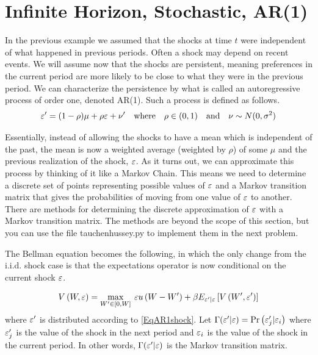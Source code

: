 \section*{Infinite Horizon, Stochastic, AR(1)}\label{SecRecProbInfinHorStochAR1}

In the previous example we assumed that the shocks at time $t$ were independent of what happened in previous periods.  Often a shock may depend on recent events.  We will assume now that the shocks are persistent, meaning preferences in the current period are more likely to be close to what they were in the previous period.  We can characterize the persistence by what is called an autoregressive process of order one, denoted AR(1).  Such a process is defined as follows.
\begin{equation}\label{EqAR1shock}
   \varepsilon' = (1-\rho)\mu + \rho\varepsilon + \nu' \quad\text{where}\quad \rho\in(0,1) \quad\text{and}\quad \nu\sim N(0,\sigma^2)
\end{equation}

Essentially, instead of allowing the shocks to have a mean which is independent of the past, the mean is now a weighted average (weighted by $\rho$) of some $\mu$ and the previous realization of the shock, $\varepsilon$.  As it turns out, we can approximate this process by thinking of it like a Markov Chain. This means we need to determine a discrete set of points representing possible values of $\varepsilon$ and a Markov transition matrix that gives the probabilities of moving from one value of $\varepsilon$ to another.  There are methods for determining the discrete approximation of $\varepsilon$ with a Markov transition matrix.  The methods are beyond the scope of this section, but you can use the file tauchenhussey.py to implement them in the next problem.

The Bellman equation becomes the following, in which the only change from the i.i.d. shock case is that the expectations operator is now conditional on the current shock $\varepsilon$.

\begin{equation*}
   V\left(W,\varepsilon\right) = \max_{W'\in[0,W]}\: \varepsilon u\left(W - W'\right) + \beta E_{\varepsilon'|\varepsilon}\left[V\left(W',\varepsilon'\right)\right]
\end{equation*}
where $\varepsilon'$ is distributed according to \eqref{EqAR1shock}. Let $\Gamma(\varepsilon'|\varepsilon)=\text{Pr}\left(\varepsilon_j'|\varepsilon_i\right)$ where $\varepsilon_j'$ is the value of the shock in the next period and $\varepsilon_i$ is the value of the shock in the current period.  In other words, $\Gamma(\varepsilon' | \varepsilon)$ is the Markov transition matrix.

